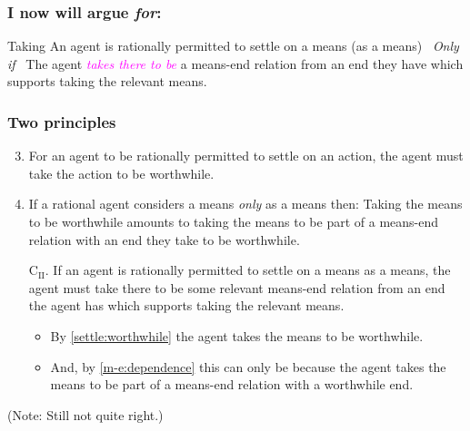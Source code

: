 \documentclass[noamssymb, compress, handout]{beamer} %
\begin{document}
\begin{frame}
  \frametitle{I now will argue \emph{for}:}

  \begin{block}{Taking}
    An agent is rationally permitted to settle on a means (as a means)
    \newline
    \mbox{ }\hfill\emph{Only if}\hfill\mbox{ }
    \newline
    The agent \textcolor{fuchsia}{\emph{takes there to be}} a means-end relation from an end they have which supports taking the relevant means.
  \end{block}
\end{frame}

\subsubsection{Two principles}
\label{sec:two-principles}

\begin{frame}

  \begin{enumerate}
    \setcounter{enumi}{2}
  \item\label{settle:worthwhile} For an agent to be rationally permitted to settle on an action, the agent must take the action to be worthwhile.
  \item\label{m-e:dependence} If a rational agent considers a means \emph{only} as a means then: \newline Taking the means to be worthwhile amounts to taking the means to be part of a means-end relation with an end they take to be worthwhile.
  \item[C\(_{\text{II}}\).] \label{together} If an agent is rationally permitted to settle on a means as a means, the agent must take there to be some relevant means-end relation from an end the agent has which supports taking the relevant means.
    \begin{itemize}
    \item By \ref{settle:worthwhile} the agent takes the means to be worthwhile.
    \item And, by \ref{m-e:dependence} this can only be because the agent takes the means to be part of a means-end relation with a worthwhile end.
    \end{itemize}
  \end{enumerate}

  (Note: Still not quite right.)
\end{frame}
\end{document}

